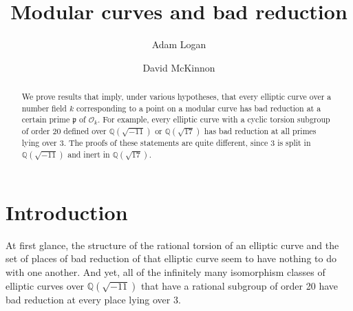 \documentclass[12pt]{amsart}
\begin{document}
\newtheorem{thm}{Theorem}[section]
\newtheorem{lem}[thm]{Lemma}
\newtheorem{dfn}[thm]{Definition}
\newtheorem{propdefn}[thm]{Proposition-Definition}
\newtheorem{cor}[thm]{Corollary}
\newtheorem{conj}[thm]{Conjecture}
\newtheorem{clm}[thm]{Claim}
\theoremstyle{remark}
\newtheorem{exm}[thm]{Example}
\newtheorem{rem}[thm]{Remark}
\def\N{{\mathbb N}}
\def\F{{\mathbb F}}
\def\G{{\mathbb G}}
\def\A{{\mathbb A}}
\def\Q{{\mathbb Q}}
\def\R{{\mathbb R}}
\def\C{{\mathbb C}}
\def\P{{\mathbb P}}
\def\Z{{\mathbb Z}}
\def\v{{\mathbf v}}
\def\p{{\mathfrak p}}
\def\x{{\mathbf x}}
\def\O{{\mathcal O}}
\def\M{{\mathcal M}}
\def\kbar{{\bar{k}}}
\def\tr{\mbox{Tr}}
\def\id{\mbox{id}}
\def\qr#1#2{\left(\frac{#1}{#2}\right)}
\renewcommand{\qedsymbol}{{\tiny $\clubsuit$ \normalsize}}
\def\qed{{\tiny $\clubsuit$ \normalsize}}


\renewcommand{\theenumi}{\alph{enumi}}

\title{Modular curves and bad reduction}

\author{Adam Logan}


\author{David McKinnon}


\begin{abstract}
    We prove results that imply, under various hypotheses, that every elliptic curve over a 
    number field $k$ corresponding to a point on a modular curve has bad reduction at a
    certain prime $\p$ of $\O_k$.
    For example, every elliptic curve with a cyclic torsion subgroup of order 20 defined over 
    $\Q(\sqrt{-11})$ or $\Q(\sqrt{17})$ has bad reduction at all primes lying over $3$.  
    The proofs of these statements are quite different, since $3$ is split in $\Q(\sqrt{-11})$
    and inert in $\Q(\sqrt{17})$.
\end{abstract}

\maketitle

\section{Introduction}

At first glance, the structure of the rational torsion of an elliptic curve and the set of places of bad reduction of that elliptic curve seem to have nothing to do with one another.  And yet, all of the infinitely many isomorphism classes of elliptic curves over $\Q(\sqrt{-11})$ that have a rational subgroup of order 20 have bad reduction at every place lying over $3$.  
\end{document}
